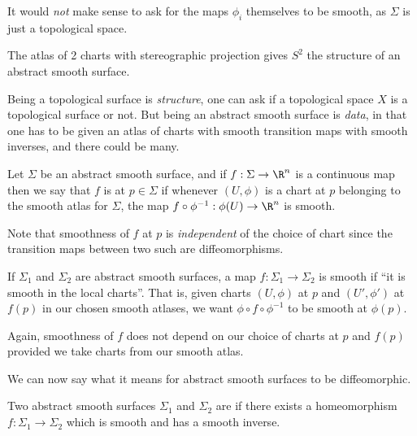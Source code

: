 \begin{remark}
    It would \emph{not} make sense to ask for the maps $\phi_i$ themselves to be smooth, as $\Sigma$ is just a topological space.
\end{remark}

\begin{example}
    The atlas of 2 charts with stereographic projection gives $S^2$ the structure of an abstract smooth surface.
\end{example}

\begin{remark}[Philosophical]
    Being a topological surface is \emph{structure}, one can ask if a topological space $X$ is a topological surface or not. But being an abstract smooth surface is \emph{data}, in that one has to be given an atlas of charts with smooth transition maps with smooth inverses, and there could be many.
\end{remark}

\begin{definition}
    Let $\Sigma$ be an abstract smooth surface, and if $f: \Sigma \rightarrow \R^n$ is a continuous map then we say that $f$ is  at $p \in \Sigma$ if whenever $(U, \phi)$ is a chart at $p$ belonging to the smooth atlas for $\Sigma$, the map $f \circ \phi^{-1}: \phi(U) \rightarrow \R^n$ is smooth.
\end{definition}

Note that smoothness of $f$ at $p$ is \emph{independent} of the choice of chart since the transition maps between two such are diffeomorphisms.

\begin{definition}
    If $\Sigma_1$ and $\Sigma_2$ are abstract smooth surfaces, a map $f: \Sigma_1 \rightarrow \Sigma_2$ is smooth if ``it is smooth in the local charts''. That is, given charts $(U, \phi)$ at $p$ and $(U', \phi')$ at $f(p)$ in our chosen smooth atlases, we want $\phi 
    \circ f \circ \phi^{-1}$ to be smooth at $\phi(p)$.
\end{definition}

Again, smoothness of $f$ does not depend on our choice of charts at $p$ and $f(p)$ provided we take charts from our smooth atlas.

We can now say what it means for abstract smooth surfaces to be diffeomorphic.

\begin{definition}[Diffeomorphic]
    Two abstract smooth surfaces $\Sigma_1$ and $\Sigma_2$ are  if there exists a homeomorphism $f: \Sigma_1 \rightarrow \Sigma_2$ which is smooth and has a smooth inverse.
\end{definition}

